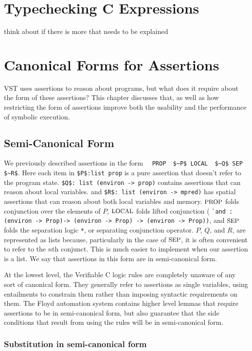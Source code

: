 \documentclass{puthesis}
\begin{document}
\chapter{Typechecking C Expressions}
think about if there is more that needs to be explained

\chapter{Canonical Forms for Assertions}

VST uses assertions to reason about programs, but what does 
it require about the form of these assertions? This chapter
discusses that, as well as how restricting the form of
assertions improve both the usability and the performance
of symbolic execution.

\section{Semi-Canonical Form}

We previously described \cite{appel14:plcc} assertions in the form
~~\lstinline{PROP  $~P$ LOCAL  $~Q$ SEP  $~R$}. 
Here each item in \lstinline|$P$:list prop| is a pure assertion that 
doesn't refer to the program state. \lstinline|$Q$: list (environ -> prop)|
contains assertions that can reason about local variables. 
and \lstinline|$R$: list (environ -> mpred)| has spatial assertions that
can reason about both local variables and memory. 
$\mbox{\small PROP}$ folds conjunction over the elements of $P$, $\mbox{\small LOCAL}$
folds lifted conjunction (
\lstinline|`and : (environ -> Prop)-> (environ -> Prop) -> (environ -> Prop))|,
and $\mbox{\small SEP}$ folds the separation logic \lstinline|*|, or separating conjunction
operator. $P$, $Q$, and $R$, are represented as lists because, particularly 
in the case of $\mbox{\small SEP}$, it is often convenient to refer to the $n$th 
conjunct. This is much easier to implement when our assertion is a list. 
We say that assertions in this form are in semi-canonical form. 

At the lowest level, the Verifiable C 
logic rules are completely unaware of any
sort of canonical form. They generally refer to assertions as single
variables, using entailments to constrain them rather than imposing
syntactic requirements on them. The Floyd automation system contains
higher level lemmas that require assertions to be in semi-canonical
form, but also guarantee that the side conditions that result from
using the rules will be in semi-canonical form. 

\subsection{Substitution in semi-canonical form}
\end{document}

